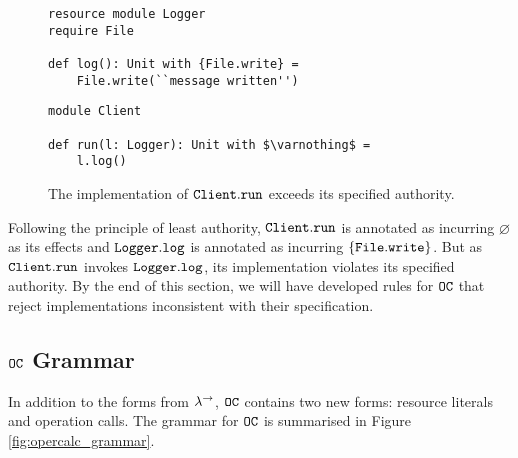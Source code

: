 \begin{figure}[h]
\vspace{-5pt}

\begin{lstlisting}
resource module Logger
require File

def log(): Unit with {File.write} =
    File.write(``message written'')
\end{lstlisting}

\begin{lstlisting}
module Client

def run(l: Logger): Unit with $\varnothing$ =
    l.log()
\end{lstlisting}

\vspace{-7pt}
\caption{The implementation of $\mathtt{Client.run}$ exceeds its specified authority.}
\label{fig:opercalc_motivating}
\end{figure}

Following the principle of least authority, $\mathtt{Client.run}$ is annotated as incurring $\varnothing$ as its effects and $\mathtt{Logger.log}$ is annotated as incurring $\{ \mathtt{File.write} \}$. But as $\mathtt{Client.run}$ invokes $\mathtt{Logger.log}$, its implementation violates its specified authority. By the end of this section, we will have developed rules for $\mathtt{OC}$ that reject implementations inconsistent with their specification.


\subsection{$\mathtt{OC}$ Grammar}

In addition to the forms from $\lambda^{\rightarrow}$, $\mathtt{OC}$ contains two new forms: resource literals and operation calls. The grammar for $\mathtt{OC}$ is summarised in Figure \ref{fig:opercalc_grammar}.

